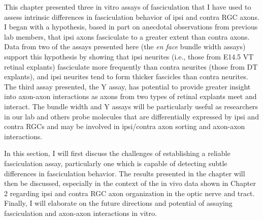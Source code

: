 This chapter presented three in vitro assays of fasciculation that I have used to assess intrinsic differences in fasciculation behavior of ipsi and contra RGC axons.
I began with a hypothesis, based in part on anecdotal observations from previous lab members, that ipsi axons fasciculate to a greater extent than contra axons.
Data from two of the assays presented here (the \emph{en face} bundle width assays) support this hypothesis by showing that ipsi neurites (i.e., those from E14.5 VT retinal explants) fasciculate more frequently than contra neurites (those from DT explants), and ipsi neurites tend to form thicker fascicles than contra neurites.
The third assay presented, the Y assay, has potential to provide greater insight into axon-axon interactions as axons from two types of retinal explants meet and interact.
The bundle width and Y assays will be particularly useful as researchers in our lab and others probe molecules that are differentially expressed by ipsi and contra RGCs \cite{wang2016ipsilateral} and may be involved in ipsi/contra axon sorting and axon-axon interactions.

In this section, I will first discuss the challenges of establishing a reliable fasciculation assay, particularly one which is capable of detecting subtle differences in fasciculation behavior.
The results presented in the chapter will then be discussed, especially in the context of the in vivo data shown in Chapter 2 regarding ipsi and contra RGC axon organization in the optic nerve and tract.
Finally, I will elaborate on the future directions and potential of assaying fasciculation and axon-axon interactions in vitro.
